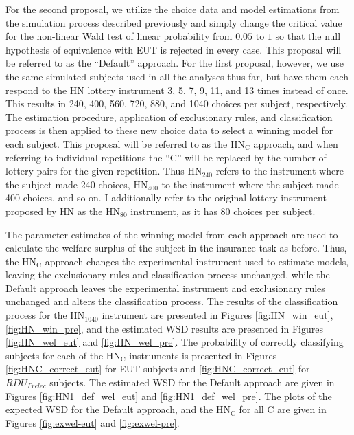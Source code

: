 \documentclass[../main.tex]{subfiles}
\begin{document}
For the second proposal, we utilize the choice data and model estimations from the simulation process described previously and simply change the critical value for the non-linear Wald test of linear probability from $0.05$ to $1$ so that the null hypothesis of equivalence with EUT is rejected in every case.
This proposal will be referred to as the \enquote{Default} approach.
For the first proposal, however, we use the same simulated subjects used in all the analyses thus far, but have them each respond to the HN lottery instrument 3, 5, 7, 9, 11, and 13 times instead of once.
This results in 240, 400, 560, 720, 880, and 1040 choices per subject, respectively.
The estimation procedure, application of exclusionary rules, and classification process is then applied to these new choice data to select a winning model for each subject.
This proposal will be referred to as the $\text{HN}_\text{C}$ approach, and when referring to individual repetitions the \enquote{C} will be replaced by the number of lottery pairs for the given repetition.
Thus $\text{HN}_{240}$ refers to the instrument where the subject made 240 choices, $\text{HN}_{400}$ to the instrument where the subject made 400 choices, and so on.
I additionally refer to the original lottery instrument proposed by HN as the $\text{HN}_{80}$ instrument, as it has 80 choices per subject.

The parameter estimates of the winning model from each approach are used to calculate the welfare surplus of the subject in the insurance task as before.
Thus, the $\text{HN}_\text{C}$ approach changes the experimental instrument used to estimate models, leaving the exclusionary rules and classification process unchanged, while the Default approach leaves the experimental instrument and exclusionary rules unchanged and alters the classification process.
The results of the classification process for the $\text{HN}_{1040}$ instrument are presented in Figures \ref{fig:HN_win_eut}, \ref{fig:HN_win_pre}, and the estimated WSD results are presented in Figures \ref{fig:HN_wel_eut} and \ref{fig:HN_wel_pre}.
The probability of correctly classifying subjects for each of the $\text{HN}_\text{C}$ instruments is presented in Figures \ref{fig:HNC_correct_eut} for EUT subjects and \ref{fig:HNC_correct_eut} for $\mathit{RDU_{Prelec}}$ subjects.
The estimated WSD for the Default approach are given in Figures \ref{fig:HN1_def_wel_eut} and \ref{fig:HN1_def_wel_pre}.
The plots of the expected WSD for the Default approach, and the $\text{HN}_\text{C}$ for all C are given in Figures \ref{fig:exwel-eut} and \ref{fig:exwel-pre}.
\end{document}
